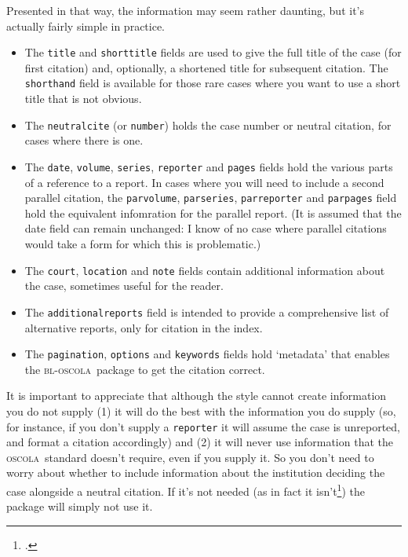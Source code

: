 \documentclass[a5paper,fontsize=9pt,DIV=1]{scrartcl}
\newcommand{\oscola}{\textsc{bl-oscola}}
\newcommand{\oscolashort}{\textsc{oscola}\nocite{oscola}}
\begin{document}
Presented in that way, the information may seem rather daunting, but
it's actually fairly simple in practice.
\begin{itemize}
\item The \texttt{title} and \texttt{shorttitle} fields are used to
  give the full title of the case (for first citation) and,
  optionally, a shortened title for subsequent citation. The
  \texttt{shorthand} field is available for those rare cases where you
  want to use a short title that is not obvious.
\item The \texttt{neutralcite} (or \texttt{number}) holds the case
number or neutral citation, for cases where
  there is one.
\item The \texttt{date}, \texttt{volume}, \texttt{series},
  \texttt{reporter} and \texttt{pages} fields hold the various
  parts of a reference to a report. In cases where you will need to
  include a second parallel citation, the \texttt{parvolume},
  \texttt{parseries}, \texttt{parreporter} and \texttt{parpages} field
  hold the equivalent infomration for the parallel report. (It is
  assumed that the date field can remain unchanged: I know of no case
  where parallel citations would take a form for which this is problematic.)
\item The \texttt{court}, \texttt{location} and \texttt{note} fields contain
  additional information about the case, sometimes useful for the
  reader.
\item The \texttt{additionalreports} field is intended to provide a
comprehensive list of alternative reports, only for citation in the index.
\item The \texttt{pagination}, \texttt{options} and \texttt{keywords}
  fields hold `metadata' that enables the \oscola\ package to get the
  citation correct.
\end{itemize}

It is important to appreciate that although the style cannot create
information you do not supply (1) it will do the best with the
information you do supply (so, for instance, if you don't supply a
\texttt{reporter} it will assume the case is unreported, and
format a citation accordingly) and (2) it will never use information
that the \oscolashort\ standard doesn't require, even if you
supply it. So you don't need to worry about whether to include
information about the institution deciding the case alongside a
neutral citation. If it's not needed (as in fact it
isn't\footcite[16]{oscola}) the package will simply not use it.
\end{document}
